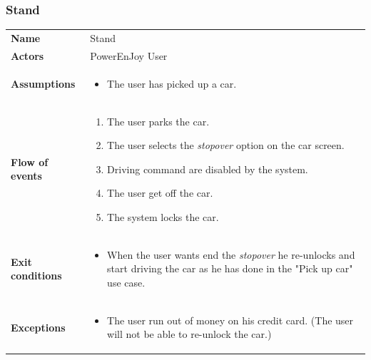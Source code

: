 \documentclass[english]{article}
\newcommand{\stopover}{\textit{stopover }}
\begin{document}
	\subsubsection{Stand}
	\begin{center}
	\begin{tabular}{l||p{10cm}}
	\textbf{Name} 
		& Stand\\ [8px]
	\textbf{Actors} 
		& PowerEnJoy User\\ [8px]
	\textbf{Assumptions} 
	& \begin{itemize}
		\item The user has picked up a car. 
	\end{itemize}\\
	\textbf{Flow of events}
		& \begin{enumerate}
 		\item The user parks the car.
 		\item The user selects the \stopover option on the car screen.
		\item Driving command are disabled by the system. 
		\item The user get off the car.
		\item The system locks the car.
		\end{enumerate}\\ 
	\textbf{Exit conditions}
		&\begin{itemize}
			\item When the user wants end the \stopover he re-unlocks and start driving the car as he has done in the "Pick up car" use case.
		\end{itemize}\\
	\textbf{Exceptions}
		& \begin{itemize}
			\item The user run out of money on his credit card. (The user will not be able to re-unlock the car.)
		\end{itemize}
	\end{tabular}
	\end{center}
	
\end{document}
